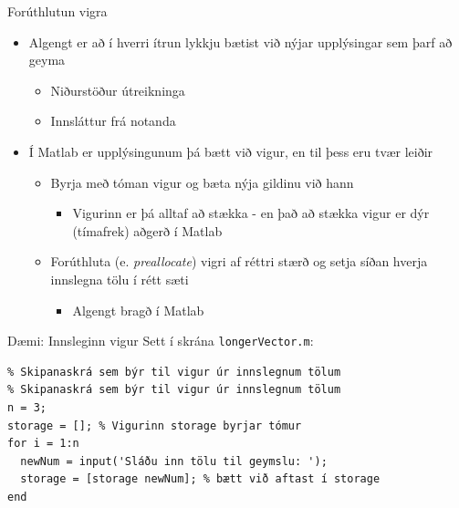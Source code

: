 \documentclass{beamer}
\begin{document}
\begin{frame}{Forúthlutun vigra}
\vspace{\baselineskip}
\begin{itemize}
 \item Algengt er að í hverri ítrun lykkju bætist við nýjar upplýsingar sem þarf að geyma
 \begin{itemize}
  \item Niðurstöður útreikninga
  \item Innsláttur frá notanda
 \end{itemize}
 \item Í Matlab er upplýsingunum þá bætt við vigur, en til þess eru tvær leiðir
 \begin{itemize}
  \item Byrja með tóman vigur og bæta nýja gildinu við hann
  \begin{itemize}
   \item Vigurinn er þá alltaf að stækka - en það að stækka vigur er dýr (tímafrek) aðgerð í Matlab
  \end{itemize}
  \item Forúthluta (e. \emph{preallocate}) vigri af réttri stærð og setja síðan hverja innslegna tölu í rétt sæti
  \begin{itemize}
   \item Algengt bragð í Matlab
  \end{itemize}
 \end{itemize}
\end{itemize}
\end{frame}

\begin{frame}[fragile]{Dæmi: Innsleginn vigur}
Sett í skrána \texttt{longerVector.m}:
\begin{verbatim}
% Skipanaskrá sem býr til vigur úr innslegnum tölum
% Skipanaskrá sem býr til vigur úr innslegnum tölum
n = 3;
storage = []; % Vigurinn storage byrjar tómur
for i = 1:n
  newNum = input('Sláðu inn tölu til geymslu: ');
  storage = [storage newNum]; % bætt við aftast í storage
end
\end{verbatim}
\end{frame}
\end{document}
